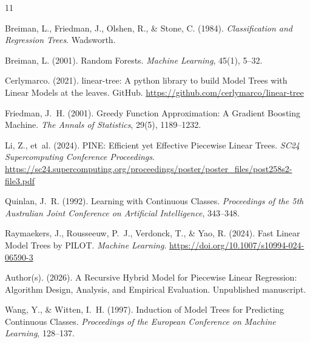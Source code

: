 \documentclass[11pt,a4paper]{article}
\begin{document}
\begin{thebibliography}{11}

Breiman, L., Friedman, J., Olshen, R., \& Stone, C. (1984).
\newblock \emph{Classification and Regression Trees}.
\newblock Wadsworth.

Breiman, L. (2001).
\newblock Random Forests.
\newblock \emph{Machine Learning}, 45(1), 5--32.

Cerlymarco. (2021).
\newblock linear-tree: A python library to build Model Trees with Linear Models at the leaves.
\newblock GitHub. \url{https://github.com/cerlymarco/linear-tree}

Friedman, J.~H. (2001).
\newblock Greedy Function Approximation: A Gradient Boosting Machine.
\newblock \emph{The Annals of Statistics}, 29(5), 1189--1232.

Li, Z., et~al. (2024).
\newblock PINE: Efficient yet Effective Piecewise Linear Trees.
\newblock \emph{SC24 Supercomputing Conference Proceedings}.
\newblock \url{https://sc24.supercomputing.org/proceedings/poster/poster_files/post258s2-file3.pdf}

Quinlan, J.~R. (1992).
\newblock Learning with Continuous Classes.
\newblock \emph{Proceedings of the 5th Australian Joint Conference on Artificial Intelligence}, 343--348.

Raymaekers, J., Rousseeuw, P.~J., Verdonck, T., \& Yao, R. (2024).
\newblock Fast Linear Model Trees by PILOT.
\newblock \emph{Machine Learning}.
\newblock \url{https://doi.org/10.1007/s10994-024-06590-3}

Author(s). (2026).
\newblock A Recursive Hybrid Model for Piecewise Linear Regression: Algorithm Design, Analysis, and Empirical Evaluation.
\newblock Unpublished manuscript.

Wang, Y., \& Witten, I.~H. (1997).
\newblock Induction of Model Trees for Predicting Continuous Classes.
\newblock \emph{Proceedings of the European Conference on Machine Learning}, 128--137.

\end{thebibliography}
\end{document}
